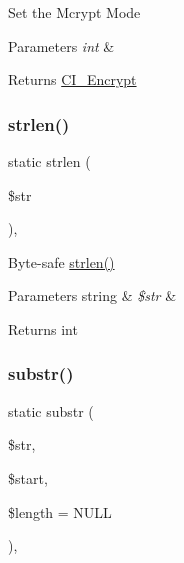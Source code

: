 Set the Mcrypt Mode


\begin{DoxyParams}{Parameters}
{\em int} & \\
\hline
\end{DoxyParams}
\begin{DoxyReturn}{Returns}
\mbox{\hyperlink{class_c_i___encrypt}{C\+I\+\_\+\+Encrypt}} 
\end{DoxyReturn}
\mbox{\label{class_c_i___encrypt_a4c29a687d4ed62c26a10e41d98930d5f}} 
\subsubsection{\texorpdfstring{strlen()}{strlen()}}
{\footnotesize\ttfamily static strlen (\begin{DoxyParamCaption}\item[{}]{\$str }\end{DoxyParamCaption})\hspace{0.3cm}{\ttfamily [static]}, {\ttfamily [protected]}}

Byte-\/safe \mbox{\hyperlink{class_c_i___encrypt_a4c29a687d4ed62c26a10e41d98930d5f}{strlen()}}


\begin{DoxyParams}[1]{Parameters}
string & {\em \$str} & \\
\hline
\end{DoxyParams}
\begin{DoxyReturn}{Returns}
int 
\end{DoxyReturn}
\mbox{\label{class_c_i___encrypt_a101caef57ef0b165da5747e2c2e6c9dc}} 
\subsubsection{\texorpdfstring{substr()}{substr()}}
{\footnotesize\ttfamily static substr (\begin{DoxyParamCaption}\item[{}]{\$str,  }\item[{}]{\$start,  }\item[{}]{\$length = {\ttfamily NULL} }\end{DoxyParamCaption})\hspace{0.3cm}{\ttfamily [static]}, {\ttfamily [protected]}}

